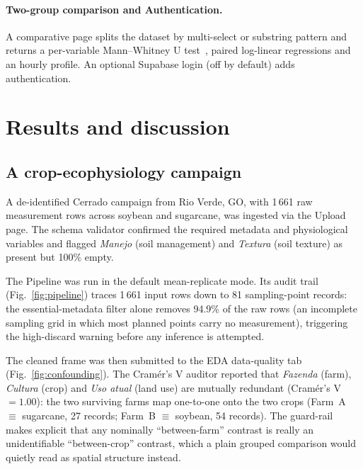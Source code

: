 \documentclass[11pt, letterpaper]{article}
\begin{document}
\paragraph{Two-group comparison and Authentication.} A comparative page splits the dataset by multi-select or substring pattern and returns a per-variable Mann--Whitney U test~\cite{Mann1947}, paired log-linear regressions and an hourly profile. An optional Supabase login (off by default) adds authentication.

\section{Results and discussion}\label{sec:examples}

\subsection{A crop-ecophysiology campaign}\label{sec:ex-physio}

A de-identified Cerrado campaign from Rio Verde, GO, with 1\,661 raw measurement rows across soybean and sugarcane, was ingested via the Upload page. The schema validator confirmed the required metadata and physiological variables and flagged \emph{Manejo} (soil management) and \emph{Textura} (soil texture) as present but 100\% empty.

The Pipeline was run in the default mean-replicate mode. Its audit trail (Fig.~\ref{fig:pipeline}) traces 1\,661 input rows down to 81 sampling-point records: the essential-metadata filter alone removes 94.9\% of the raw rows (an incomplete sampling grid in which most planned points carry no measurement), triggering the high-discard warning before any inference is attempted.

The cleaned frame was then submitted to the EDA data-quality tab (Fig.~\ref{fig:confounding}). The Cram\'er's V auditor reported that \emph{Fazenda} (farm), \emph{Cultura} (crop) and \emph{Uso atual} (land use) are mutually redundant (Cram\'er's V $=1.00$): the two surviving farms map one-to-one onto the two crops (Farm~A $\equiv$ sugarcane, 27 records; Farm~B $\equiv$ soybean, 54 records). The guard-rail makes explicit that any nominally ``between-farm'' contrast is really an unidentifiable ``between-crop'' contrast, which a plain grouped comparison would quietly read as spatial structure instead.
\end{document}
